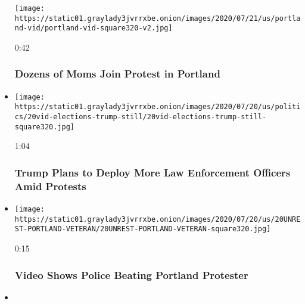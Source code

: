 \begin{itemize}
  \texttt{[image: https://static01.graylady3jvrrxbe.onion/images/2020/07/21/us/portland-vid/portland-vid-square320-v2.jpg]}

  0:42

  \hypertarget{dozens-of-moms-join-protest-in-portland}{%
  \subsubsection{Dozens of Moms Join Protest in
  Portland}\label{dozens-of-moms-join-protest-in-portland}}
\item
  \href{https://www.nytimes3xbfgragh.onion/video/us/100000007247868/trump-deploy-federal-agents.html?action=click\&module=video-series-bar\&region=header\&pgtype=Article\&playlistId=video/minneapolis-george-floyd-death-video}{}

  \texttt{[image: https://static01.graylady3jvrrxbe.onion/images/2020/07/20/us/politics/20vid-elections-trump-still/20vid-elections-trump-still-square320.jpg]}

  1:04

  \hypertarget{trump-plans-to-deploy-more-law-enforcement-officers-amid-protests}{%
  \subsubsection{Trump Plans to Deploy More Law Enforcement Officers
  Amid
  Protests}\label{trump-plans-to-deploy-more-law-enforcement-officers-amid-protests}}
\item
  \href{https://www.nytimes3xbfgragh.onion/video/us/100000007247168/video-shows-police-beating-portland-protester.html?action=click\&module=video-series-bar\&region=header\&pgtype=Article\&playlistId=video/minneapolis-george-floyd-death-video}{}

  \texttt{[image: https://static01.graylady3jvrrxbe.onion/images/2020/07/20/us/20UNREST-PORTLAND-VETERAN/20UNREST-PORTLAND-VETERAN-square320.jpg]}

  0:15

  \hypertarget{video-shows-police-beating-portland-protester}{%
  \subsubsection{Video Shows Police Beating Portland
  Protester}\label{video-shows-police-beating-portland-protester}}
\item
  \href{https://www.nytimes3xbfgragh.onion/video/us/100000007241193/george-floyd-civil-lawsuit-minneapolis.html?action=click\&module=video-series-bar\&region=header\&pgtype=Article\&playlistId=video/minneapolis-george-floyd-death-video}{}


\end{itemize}
